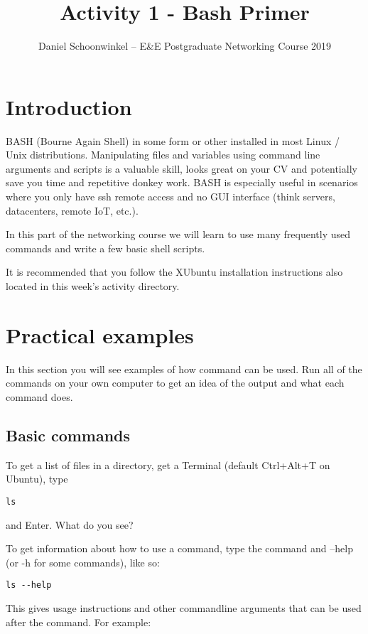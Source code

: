\documentclass[a4paper]{article}
\title{Activity 1 - Bash Primer}
\author{Daniel Schoonwinkel -- E\&E Postgraduate Networking Course 2019}
\begin{document}
\maketitle

\section{Introduction}



BASH (Bourne Again Shell) in some form or other installed in most Linux / Unix distributions. Manipulating files and variables using command line arguments and scripts is a valuable skill, looks great on your CV and potentially save you time and repetitive donkey work. BASH is especially useful in scenarios where you only have ssh remote access and no GUI interface (think servers, datacenters, remote IoT, etc.). 

In this part of the networking course we will learn to use many frequently used commands and write a few basic shell scripts. 

It is recommended that you follow the XUbuntu installation instructions also located in this week's activity directory.  

\section{Practical examples}
In this section you will see examples of how command can be used. Run all of the commands on your own computer to get an idea of the output and what each command does.

\subsection{Basic commands}

To get a list of files in a directory, get a Terminal (default Ctrl+Alt+T on Ubuntu), type

\begin{lstlisting}
ls
\end{lstlisting}
and Enter. What do you see?

To get information about how to use a command, type the command and --help (or -h for some commands), like so: 

\begin{lstlisting}
ls --help
\end{lstlisting}
This gives usage instructions and other commandline arguments that can be used after the command. For example: 
\end{document}

